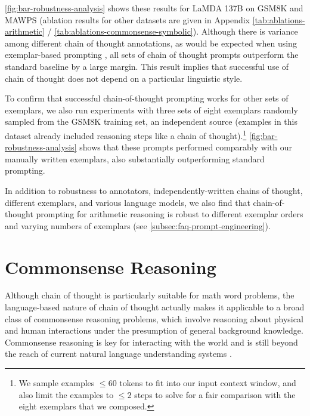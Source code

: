 \documentclass[]{article}
\theoremstyle{plain}
\theoremstyle{definition}
\theoremstyle{remark}
\newcommand{\lamda}[0]{LaMDA}
\begin{document}
\cref{fig:bar-robustness-analysis} shows these results for \lamda{} 137B on GSM8K and MAWPS (ablation results for other datasets are given in Appendix \cref{tab:ablations-arithmetic} / \cref{tab:ablations-commonsense-symbolic}).
Although there is variance among different chain of thought annotations, as would be expected when using exemplar-based prompting \citep{le-scao-rush-2021-many,reynolds2021prompt,zhao2021calibrate}, all sets of chain of thought prompts outperform the standard baseline by a large margin. %
This result implies that successful use of chain of thought does not depend on a particular linguistic style.

To confirm that successful chain-of-thought prompting works for other sets of exemplars, we also run experiments with three sets of eight exemplars randomly sampled from the GSM8K training set, an independent source (examples in this dataset already included reasoning steps like a chain of thought).\footnote{We sample examples $\leq 60$ tokens to fit into our input context window, and also limit the examples to $\leq 2$ steps to solve for a fair comparison with the eight exemplars that we composed.}
\cref{fig:bar-robustness-analysis} shows that these prompts performed comparably with our manually written exemplars, also substantially outperforming standard prompting.

In addition to robustness to annotators, independently-written chains of thought, different exemplars, and various language models, we also find that chain-of-thought prompting for arithmetic reasoning is robust to different exemplar orders and varying numbers of exemplars (see \cref{subsec:faq-prompt-engineering}).

\section{Commonsense Reasoning}\label{sec:commonsense-reasoning}

Although chain of thought is particularly suitable for math word problems, the language-based nature of chain of thought actually makes it applicable to a broad class of commonsense reasoning problems, which involve reasoning about physical and human interactions under the presumption of general background knowledge.
Commonsense reasoning is key for interacting with the world and is still beyond the reach of current natural language understanding systems \citep{talmor2022commonsenseqa}.
\end{document}
